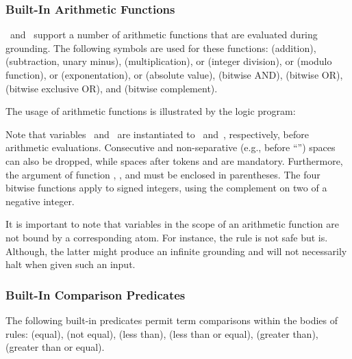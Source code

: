 \subsubsection{Built-In Arithmetic Functions}\label{subsec:gringo:arith}

\gringo\ and \clingo\ support a number of arithmetic functions that
are evaluated during grounding.
The following symbols are used for these functions:
\code{+} (addition),
\code{-} (subtraction, unary minus),
\code{*} (multiplication),
\code{/} or  (integer division),
\code{\textbackslash} or  (modulo function),
\code{**} or  (exponentation),
\code{|$\cdot$|} or  (absolute value),
\code{\&} (bitwise AND),
 (bitwise OR),
\code{\^} (bitwise exclusive OR), and
\code{\textasciitilde} (bitwise complement).

\begin{example}\label{ex:arith:fun}
The usage of arithmetic functions is illustrated by the logic program:%
%

%
Note that variables~ and~ are instantiated to~ and~,
respectively, before arithmetic evaluations.
Consecutive and non-separative (e.g., before ``\code{(}'')
spaces can also be dropped,
while spaces after tokens  and  are mandatory.
Furthermore, the argument of function , , and  must be enclosed in parentheses.
The four bitwise functions apply to signed integers,
using the complement on two of a negative integer.
\eexample
\end{example}

It is important to note that variables
in the scope of an arithmetic function are not bound by a corresponding atom.
For instance, the rule  is not safe but  is.
Although, the latter might produce an infinite grounding 
and \gringo{} will not necessarily halt when given such an input.

\subsubsection{Built-In Comparison Predicates}\label{subsec:gringo:comp}

The following built-in predicates permit term comparisons
within the bodies of rules:
\code{==} (equal),
\code{!=} (not equal),
\code{<} (less than),
\code{<=} (less than or equal),
\code{>} (greater than),
\code{>=} (greater than or equal).

